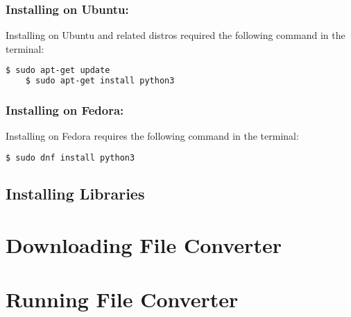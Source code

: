 \documentclass[
	a4paper, %
	12pt, %
]{CSSullivanBusinessReport}
\begin{document}
\begin{fullwidth}
\subsubsection{Installing on Ubuntu:}
Installing on Ubuntu and related distros required the following command in the terminal:
\begin{lstlisting}[language=bash]
	$ sudo apt-get update
	$ sudo apt-get install python3
\end{lstlisting}

\subsubsection{Installing on Fedora:}
Installing on Fedora requires the following command in the terminal:
\begin{lstlisting}[language=bash]
	$ sudo dnf install python3
\end{lstlisting}
\subsection{Installing Libraries}

\section{Downloading File Converter}
\section{Running File Converter}
\newpage

\end{fullwidth}





\printbibliography
\end{document}
